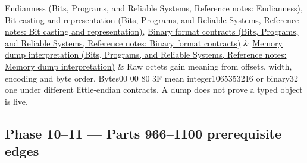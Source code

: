 {\begin{longtable}[]
\href{../01-Bits-Programs-and-Reliable-Systems/main.pdf\#nameddest=appendix-bc07c3d25b18}{Endianness (Bits, Programs, and Reliable Systems, Reference notes: Endianness)}, \href{../01-Bits-Programs-and-Reliable-Systems/main.pdf\#nameddest=appendix-34ee45f161c1}{Bit casting and representation (Bits, Programs, and Reliable Systems, Reference notes: Bit casting and representation)}, \href{../01-Bits-Programs-and-Reliable-Systems/main.pdf\#nameddest=appendix-590bbb2424c1}{Binary format contracts (Bits, Programs, and Reliable Systems, Reference notes: Binary format contracts)} & \href{../01-Bits-Programs-and-Reliable-Systems/main.pdf\#nameddest=appendix-230b59c0676b}{Memory dump interpretation (Bits, Programs, and Reliable Systems, Reference notes: Memory dump interpretation)} & Raw octets gain meaning from offsets, width, encoding and byte order. Bytes00 00 80 3F mean integer1065353216 or binary32 one under different little-endian contracts. A dump does not prove a typed object is live. \\
\end{longtable}
}

\subsection{Phase 10--11 --- Parts 966--1100 prerequisite edges}\label{appendix-4ad47bdd269a-phase-1011-parts-9661100-prerequisite-edges}

